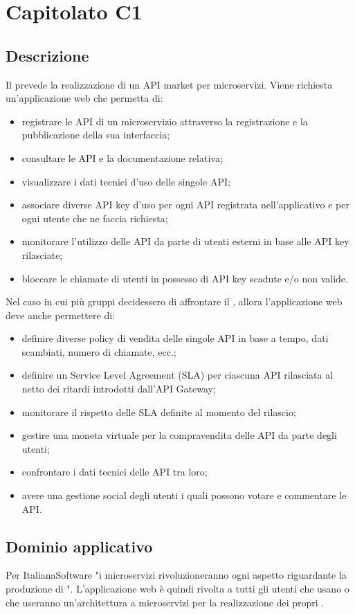 \section {Capitolato C1}
	\subsection {Descrizione}
		Il  prevede la realizzazione di un API market per microservizi. Viene richiesta un'applicazione web che permetta di:
		\begin {itemize}
			\item registrare le API di un microservizio attraverso la registrazione e la pubblicazione della sua interfaccia;
			\item consultare le API e la documentazione relativa;
			\item visualizzare i dati tecnici d'uso delle singole API;
			\item associare diverse API key d'uso per ogni API registrata nell'applicativo e per ogni utente che ne faccia richiesta;
			\item monitorare l'utilizzo delle API da parte di utenti esterni in base alle API key rilasciate;
			\item bloccare le chiamate di utenti in possesso di API key scadute e/o non valide.
		\end {itemize}
		Nel caso in cui più gruppi decidessero di affrontare il , allora l'applicazione web deve anche permettere di:
		\begin {itemize}
			\item definire diverse policy di vendita delle singole API in base a tempo, dati scambiati, numero di chiamate, ecc.;
			\item definire un Service Level Agreement (SLA) per ciascuna API rilasciata al netto dei ritardi introdotti dall'API Gateway;
			\item monitorare il rispetto delle SLA definite al momento del rilascio;
			\item gestire una moneta virtuale per la compravendita delle API da parte degli utenti;
			\item confrontare i dati tecnici delle API tra loro;
			\item avere una gestione social degli utenti i quali possono votare e commentare le API.
		\end {itemize}
	\subsection {Dominio applicativo} 
		Per ItalianaSoftware "i microservizi rivoluzioneranno ogni aspetto riguardante la produzione di ". L'applicazione web è quindi rivolta a tutti gli utenti che usano o che useranno 
		un'architettura a microservizi per la realizzazione dei propri .
